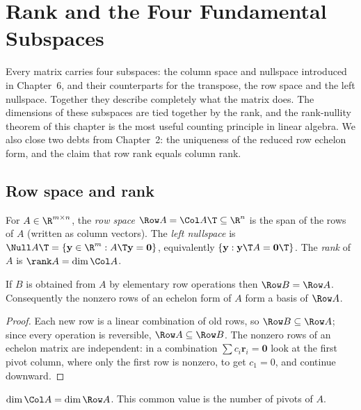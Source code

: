 \chapter{Rank and the Four Fundamental Subspaces}

Every matrix carries four subspaces: the column space and nullspace introduced in Chapter~6, and their counterparts for the transpose, the row space and the left nullspace. Together they describe completely what the matrix does. The dimensions of these subspaces are tied together by the rank, and the rank-nullity theorem of this chapter is the most useful counting principle in linear algebra. We also close two debts from Chapter~2: the uniqueness of the reduced row echelon form, and the claim that row rank equals column rank.

\section{Row space and rank}

\begin{definition}
For $A\in\R^{m\times n}$, the \emph{row space} $\Row A=\Col A\T\subseteq\R^n$ is the span of the rows of $A$ (written as column vectors). The \emph{left nullspace} is $\Null A\T=\{\mathbf{y}\in\R^m:A\T\mathbf{y}=\mathbf{0}\}$, equivalently $\{\mathbf{y}:\mathbf{y}\T A=\mathbf{0}\T\}$. The \emph{rank} of $A$ is $\rank A=\dim\Col A$.
\end{definition}

\begin{proposition}\label{prop:rowspace}
If $B$ is obtained from $A$ by elementary row operations then $\Row B=\Row A$. Consequently the nonzero rows of an echelon form of $A$ form a basis of $\Row A$.
\end{proposition}

\begin{proof}
Each new row is a linear combination of old rows, so $\Row B\subseteq\Row A$; since every operation is reversible, $\Row A\subseteq\Row B$. The nonzero rows of an echelon matrix are independent: in a combination $\sum c_i\mathbf{r}_i=\mathbf{0}$ look at the first pivot column, where only the first row is nonzero, to get $c_1=0$, and continue downward.
\end{proof}

\begin{theorem}\label{thm:rowcol}
$\dim\Col A=\dim\Row A$. This common value is the number of pivots of $A$.
\end{theorem}

